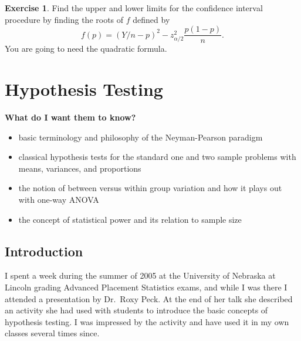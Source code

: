 \documentclass[]{book}
\providecommand{\tightlist}{%
  \setlength{\itemsep}{0pt}\setlength{\parskip}{0pt}}
\numberwithin{equation}{chapter}
\numberwithin{figure}{chapter}
\theoremstyle{plain}
\theoremstyle{definition}
\newtheorem{xca}{Exercise}[chapter]
\theoremstyle{remark}
\theoremstyle{definition}
\theoremstyle{definition}
\theoremstyle{remark}
\begin{document}
\bigskip

\begin{xca}
Find the upper and lower limits for the confidence interval procedure by
finding the roots of \(f\) defined by
\[ f(p)=\left(Y/n-p\right)^{2}-z_{\alpha/2}^{2}\frac{p(1-p)}{n}.  \] You
are going to need the quadratic formula.
\end{xca}

\chapter{Hypothesis Testing}\label{cha-hypothesis-testing}

\textbf{What do I want them to know?}

\begin{itemize}
\tightlist
\item
  basic terminology and philosophy of the Neyman-Pearson paradigm
\item
  classical hypothesis tests for the standard one and two sample
  problems with means, variances, and proportions
\item
  the notion of between versus within group variation and how it plays
  out with one-way ANOVA
\item
  the concept of statistical power and its relation to sample size
\end{itemize}

\section{Introduction}\label{sec-introduction-hypothesis}

I spent a week during the summer of 2005 at the University of Nebraska
at Lincoln grading Advanced Placement Statistics exams, and while I was
there I attended a presentation by Dr.~Roxy Peck. At the end of her talk
she described an activity she had used with students to introduce the
basic concepts of hypothesis testing. I was impressed by the activity
and have used it in my own classes several times since.
\end{document}
